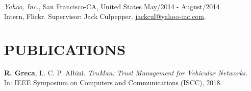 \documentclass[margin]{res}
\begin{document}
\begin{resume}
			{\sl Yahoo, Inc.}, San Francisco-CA, United States \hfill May/2014 - August/2014 \\
			Intern, Flickr.
			Supervisor: Jack Culpepper, \href{mailto:jackcul@yahoo-inc.com}{jackcul@yahoo-inc.com}.

			

		\section{PUBLICATIONS}
			\textbf{R. Greca}, L. C. P. Albini. {\sl TruMan: Trust Management for Vehicular Networks}. In: IEEE Symposium on Computers and Communications (ISCC), 2018.
	

\end{resume}
\end{document}
